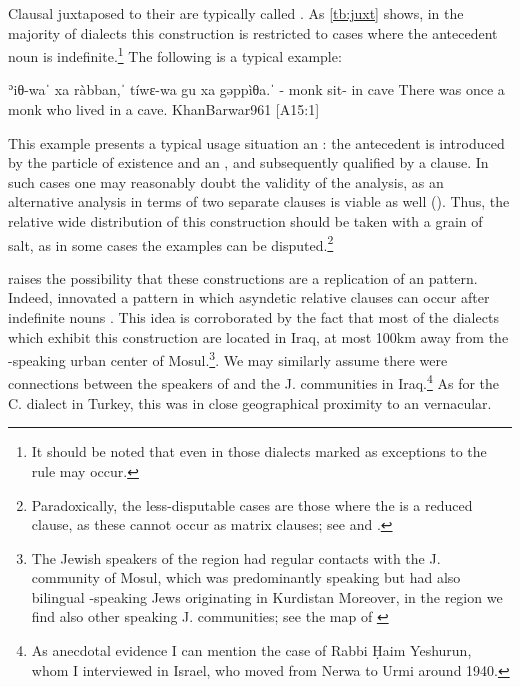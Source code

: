 Clausal \secns juxtaposed to their \prims are typically called . As \ref{tb:juxt} shows, in the majority of dialects this construction is restricted to cases where the antecedent noun is indefinite.\footnote{It should be noted that even in those dialects marked as \indef{} exceptions to the rule may occur.} The following is a typical example:

{ʾiθ-waˈ xa\cb{} ràbban,ˈ tíwɛ-wa gu\cb{} xa\cb{} gəppìθa.ˈ}
{\exist-\pst{} \indef\cb{} monk sit-\pst{} in\cb{} \indef\cb{} cave}
{There was once a monk who lived in a cave.}
{KhanBarwar}{961 {[A15:1]}}

This example presents a typical usage situation an : the antecedent is introduced by the particle of existence and an , and subsequently qualified by a clause. In such cases one may reasonably doubt the validity of the  analysis, as an alternative analysis in terms of two separate clauses is viable as well (). Thus, the relative wide distribution of this construction should be taken with a grain of salt, as in some cases the examples can be disputed.\footnote{Paradoxically, the less-disputable cases are those where the \secn is a reduced clause, as these cannot occur as matrix clauses; see \JZax {} and \Qar {}.}

\citet[138]{CohenZakho} raises the possibility that these constructions are a replication of an  pattern. Indeed,  innovated a pattern in which asyndetic relative clauses can occur after indefinite nouns \parencites[494]{BadawiCarter}[for the historical development see][]{PatElmorphosyntax}.  This idea is corroborated by the fact that most of the dialects which exhibit this construction are located in Iraq, at most 100km away from the -speaking urban center of Mosul.\footnote{The Jewish  speakers of the region had regular contacts with the  J. community of Mosul, which was predominantly  speaking but had also bilingual -speaking Jews originating in Kurdistan  \parencites[XXV]{SabarNerwa}{SabarArabic}[54]{SabarEuropean} 
Moreover, in the region we find also other  speaking J. communities; see the map of \citet[4]{JastrowAqra}}. We may similarly assume there were connections between the speakers of \JUrm and the J. communities in Iraq.\footnote{As anecdotal evidence I can mention the case of Rabbi Ḥaim Yeshurun, whom I interviewed in Israel, who moved from Nerwa to Urmi around 1940.}
As for the C. \Her dialect in Turkey, this was in close geographical proximity to an  vernacular. 



